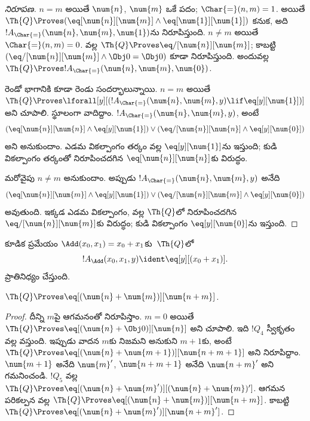 \documentclass[../../../include/open-logic-section]{subfiles}
\begin{document}
\begin{proof}[ నిరూపణ]
$n=m$ అయితే $\num{n}$, $\num{m}$ ఒకే పదం; $\Char{=}(n,m)=1$.
అయితే $\Th{Q}\Proves(\eq[\num{n}][\num{m}]\land
\eq[\num{1}][\num{1}])$ కనుక, అది
$!A_{\Char{=}}(\num{n},\num{m},\num{1})$ను నిరూపిస్తుంది. $n\neq m$ అయితే
$\Char{=}(n,m)=0$.  వల్ల
$\Th{Q}\Proves\eq/[\num{n}][\num{m}]$; కాబట్టి
$(\eq/[\num{n}][\num{m}]\land\Obj 0=\Obj 0)$ కూడా నిరూపిస్తుంది. అందువల్ల
$\Th{Q}\Proves !A_{\Char{=}}(\num{n},\num{m},\num{0})$.

రెండో భాగానికి కూడా రెండు సందర్భాలున్నాయి. $n=m$ అయితే
$\Th{Q}\Proves\lforall[y][(!A_{\Char{=}}(\num{n},\num{m},y)
\lif\eq[y][\num{1}])]$ అని చూపాలి. స్థూలంగా వాదిద్దాం.
$!A_{\Char{=}}(\num{n},\num{m},y)$, అంటే
\[
(\eq[\num{n}][\num{n}] \land \eq[y][\num{1}]) \lor
(\eq/[\num{n}][\num{n}] \land \eq[y][\num{0}])
\]
అని అనుకుందాం. ఎడమ వికల్పాంగం తర్కం వల్ల $\eq[y][\num{1}]$ను ఇస్తుంది;
కుడి వికల్పాంగం తర్కంతో నిరూపించదగిన $\eq[\num{n}][\num{n}]$కు విరుద్ధం.

మరోవైపు $n\neq m$ అనుకుందాం. అప్పుడు
$!A_{\Char{=}}(\num{n},\num{m},y)$ అనేది
\[
(\eq[\num{n}][\num{m}] \land \eq[y][\num{1}]) \lor
(\eq/[\num{n}][\num{m}] \land \eq[y][\num{0}])
\]
అవుతుంది. ఇక్కడ ఎడమ వికల్పాంగం,  వల్ల $\Th{Q}$లో
నిరూపించదగిన $\eq/[\num{n}][\num{m}]$కు విరుద్ధం; కుడి వికల్పాంగం
$\eq[y][\num{0}]$ను ఇస్తుంది.
\end{proof}

\begin{prop}
కూడిక ప్రమేయం $\Add(x_0,x_1)=x_0+x_1$కు~$\Th{Q}$లో
\[
  !A_{\Add}(x_0, x_1, y) \ident \eq[y][(x_0 + x_1)].
\]
ప్రాతినిధ్యం చేస్తుంది.
\end{prop}

\begin{lem}
$\Th{Q} \Proves \eq[(\num{n} + \num{m})][\num{n+m}]$.
\end{lem}

\begin{proof}
దీన్ని $m$పై ఆగమనంతో నిరూపిస్తాం. $m=0$ అయితే
$\Th{Q}\Proves\eq[(\num{n}+\Obj 0)][\num{n}]$ అని చూపాలి. ఇది
$!Q_4$ స్వీకృతం వల్ల వస్తుంది. ఇప్పుడు వాదన $m$కు నిజమని అనుకుని $m+1$కు,
అంటే $\Th{Q}\Proves\eq[(\num{n}+\num{m+1})][\num{n+m+1}]$ అని
నిరూపిద్దాం. $\num{m+1}$ అనేది $\num{m}'$, $\num{n+m+1}$ అనేది
$\num{n+m}'$ అని గమనించండి. $!Q_5$ వల్ల
$\Th{Q}\Proves\eq[(\num{n}+\num{m}')][(\num{n}+\num{m})']$.
ఆగమన పరికల్పన వల్ల
$\Th{Q}\Proves\eq[(\num{n}+\num{m})][\num{n+m}]$. కాబట్టి
$\Th{Q}\Proves\eq[(\num{n}+\num{m}')][\num{n+m}']$.
\end{proof}
\end{document}
